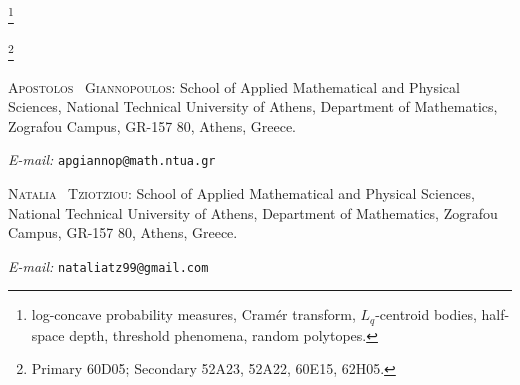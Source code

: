 \documentclass[11pt,leqno]{article}
\theoremstyle{definition}
\theoremstyle{remark}
\numberwithin{equation}{section}
\newcommand{\1}{\textbf{1}}
\begin{document}

\bigskip

\medskip


\medskip


\thanks{ log-concave probability measures, Cram\'{e}r transform, $L_q$-centroid bodies,
half-space depth, threshold phenomena, random polytopes.}

\smallskip

\thanks{ Primary 60D05; Secondary 52A23, 52A22, 60E15, 62H05.}

\bigskip

\bigskip


\noindent \textsc{Apostolos \ Giannopoulos}: School of Applied Mathematical and Physical
Sciences, National Technical University of Athens, Department of Mathematics, Zografou Campus, GR-157 80, Athens, Greece.

\smallskip

\noindent \textit{E-mail:} \texttt{apgiannop@math.ntua.gr}

\bigskip

\noindent \textsc{Natalia \ Tziotziou}: School of Applied Mathematical and Physical Sciences, National Technical University of Athens, Department of Mathematics, Zografou Campus, GR-157 80, Athens, Greece.


\smallskip

\noindent \textit{E-mail:} \texttt{nataliatz99@gmail.com}
\end{document}
